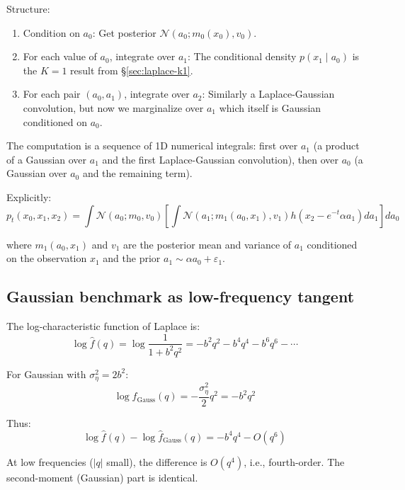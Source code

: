\documentclass[11pt,a4paper]{article}
\theoremstyle{plain}
\theoremstyle{definition}
\begin{document}
Structure:
\begin{enumerate}
\item Condition on $a_0$: Get posterior $\mathcal{N}(a_0; m_0(x_0), v_0)$.
\item For each value of $a_0$, integrate over $a_1$: The conditional density $p(x_1 \mid a_0)$ is the $K=1$ result from \S\ref{sec:laplace-k1}.
\item For each pair $(a_0, a_1)$, integrate over $a_2$: Similarly a Laplace-Gaussian convolution, but now we marginalize over $a_1$ which itself is Gaussian conditioned on $a_0$.
\end{enumerate}

The computation is a sequence of 1D numerical integrals: first over $a_1$ (a product of a Gaussian over $a_1$ and the first Laplace-Gaussian convolution), then over $a_0$ (a Gaussian over $a_0$ and the remaining term).

Explicitly:
\begin{equation}
p_t(x_0, x_1, x_2) = \int \mathcal{N}(a_0; m_0, v_0) \left[\int \mathcal{N}(a_1; m_1(a_0, x_1), v_1) h(x_2 - e^{-t}\alpha a_1) da_1\right] da_0
\end{equation}

where $m_1(a_0, x_1)$ and $v_1$ are the posterior mean and variance of $a_1$ conditioned on the observation $x_1$ and the prior $a_1 \sim \alpha a_0 + \varepsilon_1$.

\subsection{Gaussian benchmark as low-frequency tangent}
\label{sec:tangent}

The log-characteristic function of Laplace is:
\begin{equation}
\log\hat{f}(q) = \log\frac{1}{1+b^2q^2} = -b^2q^2 - b^4q^4 - b^6q^6 - \cdots
\end{equation}

For Gaussian with $\sigma_\eta^2 = 2b^2$:
\begin{equation}
\log\hat{f}_{\text{Gauss}}(q) = -\frac{\sigma_\eta^2}{2}q^2 = -b^2q^2
\end{equation}

Thus:
\begin{equation}
\log\hat{f}(q) - \log\hat{f}_{\text{Gauss}}(q) = -b^4q^4 - O(q^6)
\end{equation}

At low frequencies ($|q|$ small), the difference is $O(q^4)$, i.e., fourth-order. The second-moment (Gaussian) part is identical.
\end{document}
